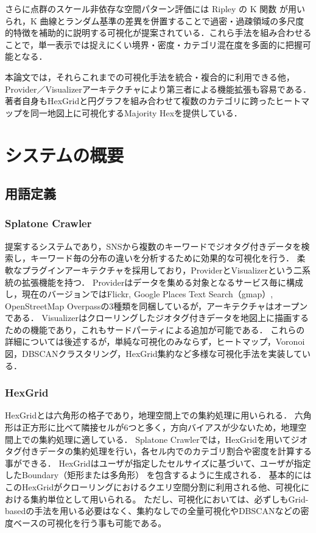 \documentclass[11pt,a4paper]{jlreq}
\begin{document}
さらに点群のスケール非依存な空間パターン評価には Ripley の K 関数\cite{ripley1976second} が用いられ，K 曲線とランダム基準の差異を併置することで過密・過疎領域の多尺度的特徴を補助的に説明する可視化が提案されている．これら手法を組み合わせることで，単一表示では捉えにくい境界・密度・カテゴリ混在度を多面的に把握可能となる．

本論文では，それらこれまでの可視化手法を統合・複合的に利用できる他，Provider／Visualizerアーキテクチャにより第三者による機能拡張も容易である．著者自身もHexGridと円グラフを組み合わせて複数のカテゴリに跨ったヒートマップを同一地図上に可視化するMajority Hexを提供している．
\section{システムの概要}
\label{sec:overview}

\subsection{用語定義}

\subsubsection{Splatone Crawler}

提案するシステムであり，SNSから複数のキーワードでジオタグ付きデータを検索し，キーワード毎の分布の違いを分析するために効果的な可視化を行う．
柔軟なプラグインアーキテクチャを採用しており，ProviderとVisualizerという二系統の拡張機能を持つ．
Providerはデータを集める対象となるサービス毎に構成し，現在のバージョンではFlickr, Google Places Text Search（gmap）, OpenStreetMap Overpassの3種類を同梱しているが，アーキテクチャはオープンである．
Visualizerはクローリングしたジオタグ付きデータを地図上に描画するための機能であり，これもサードパーティによる追加が可能である．
これらの詳細については後述するが，単純な可視化のみならず，ヒートマップ，Voronoi図，DBSCANクラスタリング，HexGrid集約など多様な可視化手法を実装している．

\subsubsection{HexGrid}

HexGridとは六角形の格子であり，地理空間上での集約処理に用いられる．
六角形は正方形に比べて隣接セルが6つと多く，方向バイアスが少ないため，地理空間上での集約処理に適している．
Splatone Crawlerでは，HexGridを用いてジオタグ付きデータの集約処理を行い，各セル内でのカテゴリ割合や密度を計算する事ができる．
HexGridはユーザが指定したセルサイズに基づいて、ユーザが指定したBoundary（矩形または多角形）
を包含するように生成される．
基本的にはこのHexGridがクローリングにおけるクエリ空間分割に利用される他、可視化における集約単位として用いられる。
ただし、可視化においては、必ずしもGrid-basedの手法を用いる必要はなく、集約なしでの全量可視化やDBSCANなどの密度ベースの可視化を行う事も可能である。
\end{document}
